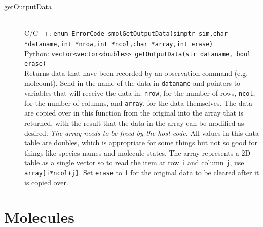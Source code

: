 \documentclass {book}
\newcommand {\ttt} {\texttt}
\begin{document}
\begin{description}
\item[getOutputData]
\hfill \\
C/C++: \ttt{enum ErrorCode smolGetOutputData(simptr sim,char *dataname,int *nrow,int *ncol,char *array,int erase)}\\
Python: \ttt{vector<vector<double>> getOutputData(str dataname, bool erase)}\\
Returns data that have been recorded by an observation command (e.g. molcount). Send in the name of the data in \ttt{dataname} and pointers to variables that will receive the data in: \ttt{nrow}, for the number of rows, \ttt{ncol}, for the number of columns, and \ttt{array}, for the data themselves. The data are copied over in this function from the original into the array that is returned, with the result that the data in the array can be modified as desired. \textit{The array needs to be freed by the host code.} All values in this data table are doubles, which is appropriate for some things but not so good for things like species names and molecule states. The array represents a 2D table as a single vector so to read the item at row \ttt{i} and column \ttt{j}, use \ttt{array[i*ncol+j]}. Set \ttt{erase} to 1 for the original data to be cleared after it is copied over.

\end{description}

\section{Molecules}
\end{document}
